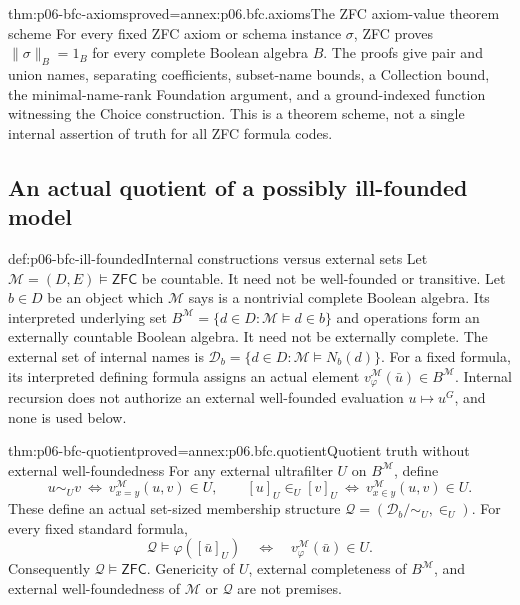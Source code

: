 \begin{hbtheorem}{thm:p06-bfc-axioms}{proved=annex:p06.bfc.axioms}{The ZFC axiom-value theorem scheme}
For every fixed ZFC axiom or schema instance \(\sigma\), ZFC proves
\(\lVert\sigma\rVert_B=1_B\) for every complete Boolean algebra \(B\).
The proofs give pair and union names, separating coefficients, subset-name
bounds, a Collection bound, the minimal-name-rank Foundation argument, and
a ground-indexed function witnessing the Choice construction.
This is a theorem scheme, not a single internal assertion of truth for
all ZFC formula codes.
\end{hbtheorem}

\subsection{An actual quotient of a possibly ill-founded model}

\begin{hbconvention}{def:p06-bfc-ill-founded}{Internal constructions versus external sets}
Let \(\mathcal M=(D,E)\models\mathsf{ZFC}\) be countable. It need not be
well-founded or transitive. Let \(b\in D\) be an object which
\(\mathcal M\) says is a nontrivial complete Boolean algebra.
Its interpreted underlying set
\(B^{\mathcal M}=\{d\in D:\mathcal M\models d\in b\}\)
and operations form an externally countable Boolean algebra.
It need not be externally complete.
The external set of internal names is
\(\mathcal D_b=\{d\in D:\mathcal M\models N_b(d)\}\).
For a fixed formula, its interpreted defining formula assigns an actual
element \(v^{\mathcal M}_\varphi(\bar u)\in B^{\mathcal M}\).
Internal recursion does not authorize an external well-founded evaluation
\(u\mapsto u^G\), and none is used below.
\end{hbconvention}

\begin{hbtheorem}{thm:p06-bfc-quotient}{proved=annex:p06.bfc.quotient}{Quotient truth without external well-foundedness}
For any external ultrafilter \(U\) on \(B^{\mathcal M}\), define
\[
 u\sim_U v\ \Longleftrightarrow\ v^{\mathcal M}_{x=y}(u,v)\in U,
 \qquad
 [u]_U\in_U[v]_U\ \Longleftrightarrow\
                  v^{\mathcal M}_{x\in y}(u,v)\in U.
\]
These define an actual set-sized membership structure
\(\mathcal Q=(\mathcal D_b/{\sim_U},\in_U)\). For every fixed standard
formula,
\[
 \mathcal Q\models\varphi([\bar u]_U)
 \quad\Longleftrightarrow\quad
 v^{\mathcal M}_\varphi(\bar u)\in U.
\]
Consequently \(\mathcal Q\models\mathsf{ZFC}\). Genericity of \(U\),
external completeness of \(B^{\mathcal M}\), and external well-foundedness
of \(\mathcal M\) or \(\mathcal Q\) are not premises.
\end{hbtheorem}

